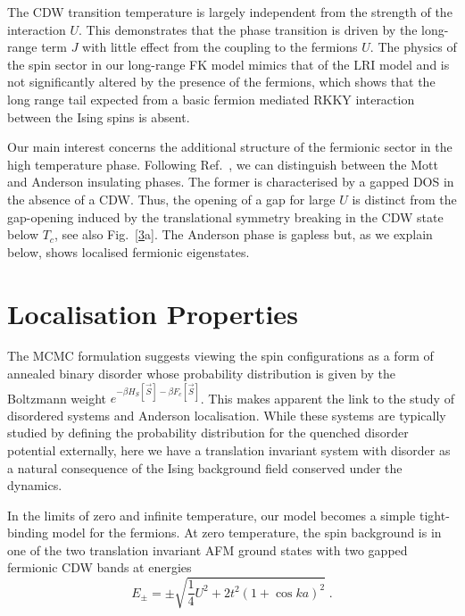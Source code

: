 The CDW transition temperature is largely independent from the strength of the interaction \(U\). This demonstrates that the phase transition is driven by the long-range term \(J\) with little effect from the coupling to the fermions \(U\). The physics of the spin sector in our long-range FK model mimics that of the LRI model and is not significantly altered by the presence of the fermions, which shows that the long range tail expected from a basic fermion mediated RKKY interaction between the Ising spins is absent.

Our main interest concerns the additional structure of the fermionic sector in the high temperature phase. Following Ref.~\autocite{antipovInteractionTunedAndersonMott2016}, we can distinguish between the Mott and Anderson insulating phases. The former is characterised by a gapped DOS in the absence of a CDW. Thus, the opening of a gap for large \(U\) is distinct from the gap-opening induced by the translational symmetry breaking in the CDW state below \(T_c\), see also Fig.~{[}\protect\hyperlink{fig:band_opening}{3}a{]}. The Anderson phase is gapless but, as we explain below, shows localised fermionic eigenstates.

\hypertarget{localisation-properties}{%
\section{Localisation Properties}\label{localisation-properties}}

The MCMC formulation suggests viewing the spin configurations as a form of annealed binary disorder whose probability distribution is given by the Boltzmann weight \(e^{-\beta H_S[\vec{S}] - \beta F_c[\vec{S}]}\). This makes apparent the link to the study of disordered systems and Anderson localisation. While these systems are typically studied by defining the probability distribution for the quenched disorder potential externally, here we have a translation invariant system with disorder as a natural consequence of the Ising background field conserved under the dynamics.

In the limits of zero and infinite temperature, our model becomes a simple tight-binding model for the fermions. At zero temperature, the spin background is in one of the two translation invariant AFM ground states with two gapped fermionic CDW bands at energies \[E_{\pm} = \pm\sqrt{\frac{1}{4}U^2 + 2t^2(1 + \cos ka)^2}\;.\]

